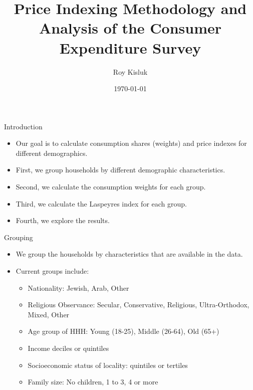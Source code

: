 \documentclass{beamer}
\title{Price Indexing Methodology and Analysis of the Consumer Expenditure Survey}
\author{Roy Kisluk}
\date{\today}
\begin{document}
\begin{frame}
    \titlepage
\end{frame}

\begin{frame}{Introduction}
    \begin{itemize}
        \item Our goal is to calculate consumption shares (weights) and price indexes for different demographics.
        \item First, we group households by different demographic characteristics.
        \item Second, we calculate the consumption weights for each group.
        \item Third, we calculate the Laspeyres index for each group.
        \item Fourth, we explore the results.
    \end{itemize}
\end{frame}

\begin{frame}{Grouping}
    \begin{itemize}
        \item We group the households by characteristics that are available in the data.
        \item Current groups include:
              \begin{itemize}
                  \item Nationality: Jewish, Arab, Other
                  \item Religious Observance: Secular, Conservative, Religious, Ultra-Orthodox, Mixed, Other
                  \item Age group of HHH: Young (18-25), Middle (26-64), Old (65+)
                  \item Income deciles or quintiles
                  \item Socioeconomic status of locality: quintiles or tertiles
                  \item Family size: No children, 1 to 3, 4 or more
              \end{itemize}
    \end{itemize}
\end{frame}
\end{document}

